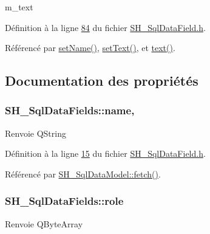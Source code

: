 m\-\_\-text 



Définition à la ligne \hyperlink{SH__SqlDataField_8h_source_l00084}{84} du fichier \hyperlink{SH__SqlDataField_8h_source}{S\-H\-\_\-\-Sql\-Data\-Field.\-h}.



Référencé par \hyperlink{classSH__SqlDataFields_a8d7b864a4ad5513af9e4c47a0d9919e8}{set\-Name()}, \hyperlink{classSH__SqlDataFields_ae098408de73ecbd532de8f44dea2b6d0}{set\-Text()}, et \hyperlink{classSH__SqlDataFields_a7d8b3f434dc35ee83a9d8d9811e0e8eb}{text()}.



\subsection{Documentation des propriétés}
\hypertarget{classSH__SqlDataFields_ac7823e9c229edea389fc55ed73bf071b}{
\subsubsection[{name}]{\setlength{\rightskip}{0pt plus 5cm}S\-H\-\_\-\-Sql\-Data\-Fields\-::name\hspace{0.3cm}{\ttfamily [read]}, {\ttfamily [write]}}}\label{classSH__SqlDataFields_ac7823e9c229edea389fc55ed73bf071b}
\begin{DoxyReturn}{Renvoie}
Q\-String 
\end{DoxyReturn}


Définition à la ligne \hyperlink{SH__SqlDataField_8h_source_l00015}{15} du fichier \hyperlink{SH__SqlDataField_8h_source}{S\-H\-\_\-\-Sql\-Data\-Field.\-h}.



Référencé par \hyperlink{classSH__SqlDataModel_ab6c206088250a66ddc8cb8d33a38e421}{S\-H\-\_\-\-Sql\-Data\-Model\-::fetch()}.

\hypertarget{classSH__SqlDataFields_ab6e952a2dfb87525307e7aff36ac8abc}{
\subsubsection[{role}]{\setlength{\rightskip}{0pt plus 5cm}S\-H\-\_\-\-Sql\-Data\-Fields\-::role\hspace{0.3cm}{\ttfamily [read]}}}\label{classSH__SqlDataFields_ab6e952a2dfb87525307e7aff36ac8abc}
\begin{DoxyReturn}{Renvoie}
Q\-Byte\-Array 
\end{DoxyReturn}


